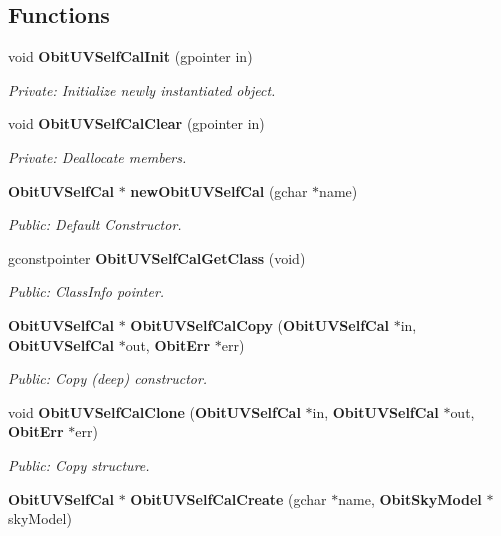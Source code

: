 \subsection*{Functions}
\begin{CompactItemize}
\item 
void {\bf Obit\-UVSelf\-Cal\-Init} (gpointer in)
\begin{CompactList}\small\item\em Private: Initialize newly instantiated object. \item\end{CompactList}\item 
void {\bf Obit\-UVSelf\-Cal\-Clear} (gpointer in)
\begin{CompactList}\small\item\em Private: Deallocate members. \item\end{CompactList}\item 
{\bf Obit\-UVSelf\-Cal} $\ast$ {\bf new\-Obit\-UVSelf\-Cal} (gchar $\ast$name)
\begin{CompactList}\small\item\em Public: Default Constructor. \item\end{CompactList}\item 
gconstpointer {\bf Obit\-UVSelf\-Cal\-Get\-Class} (void)
\begin{CompactList}\small\item\em Public: Class\-Info pointer. \item\end{CompactList}\item 
{\bf Obit\-UVSelf\-Cal} $\ast$ {\bf Obit\-UVSelf\-Cal\-Copy} ({\bf Obit\-UVSelf\-Cal} $\ast$in, {\bf Obit\-UVSelf\-Cal} $\ast$out, {\bf Obit\-Err} $\ast$err)
\begin{CompactList}\small\item\em Public: Copy (deep) constructor. \item\end{CompactList}\item 
void {\bf Obit\-UVSelf\-Cal\-Clone} ({\bf Obit\-UVSelf\-Cal} $\ast$in, {\bf Obit\-UVSelf\-Cal} $\ast$out, {\bf Obit\-Err} $\ast$err)
\begin{CompactList}\small\item\em Public: Copy structure. \item\end{CompactList}\item 
{\bf Obit\-UVSelf\-Cal} $\ast$ {\bf Obit\-UVSelf\-Cal\-Create} (gchar $\ast$name, {\bf Obit\-Sky\-Model} $\ast$sky\-Model)

\end{CompactItemize}
